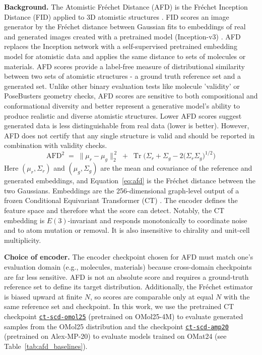 \documentclass{article} %
\begin{document}
\textbf{Background.} The Atomistic Fr\'echet Distance (AFD) is the Fr\'echet Inception Distance (FID) applied to 3D atomistic structures \cite{perez2026atomisticgenevals}. FID scores an image generator by the Fr\'echet distance between Gaussian fits to embeddings of real and generated images created with a pretrained model (Inception-v3) \cite{FID-paper}. AFD replaces the Inception network with a self-supervised pretrained embedding model for atomistic data and applies the same distance to sets of molecules or materials. AFD scores provide a label-free measure of distributional similarity between two sets of atomistic structures - a ground truth reference set and a generated set. Unlike other binary evaluation tests like molecule 'validity' or PoseBusters geometry checks, AFD scores are sensitive to both compositional and conformational diversity and better represent a generative model's ability to produce realistic and diverse atomistic structures. Lower AFD scores suggest generated data is less distinguishable from real data (lower is better). However, AFD does not certify that any single structure is valid and should be reported in combination with validity checks.
\begin{equation}
\mathrm{AFD}^2 \;=\; \lVert \mu_r - \mu_g \rVert_2^{\,2}
\;+\; \operatorname{Tr}\!\Big( \Sigma_r + \Sigma_g - 2\big(\Sigma_r \Sigma_g\big)^{1/2} \Big)
\label{eq:afd}
\end{equation}
Here $(\mu_r,\Sigma_r)$ and $(\mu_g,\Sigma_g)$ are the mean and covariance of the reference and generated embeddings, and Equation~\ref{eq:afd} is the Fr\'echet distance between the two Gaussians. Embeddings are the 256-dimensional graph-level output of a frozen Conditional Equivariant Transformer (CT) \cite{perez2026scd}. The encoder defines the feature space and therefore what the score can detect. Notably, the CT embedding is $E(3)$-invariant and responds monotonically to coordinate noise and to atom mutation or removal. It is also insensitive to chirality and unit-cell multiplicity.

\textbf{Choice of encoder.} The encoder checkpoint chosen for AFD must match one's evaluation domain (e.g., molecules, materials) because cross-domain checkpoints are far less sensitive. AFD is not an absolute score and requires a ground-truth reference set to define its target distribution. Additionally, the Fr\'echet estimator is biased upward at finite $N$, so scores are comparable only at equal $N$ with the same reference set and checkpoint. In this work, we use the pretrained CT checkpoint \href{https://huggingface.co/Ty-Perez/ct-scd-omol25}{\texttt{ct-scd-omol25}}  (pretrained on OMol25-4M) to evaluate generated samples from the OMol25 distribution and the checkpoint \href{https://huggingface.co/Ty-Perez/ct-scd-amp20}{\texttt{ct-scd-amp20} } (pretrained on Alex-MP-20) to evaluate models trained on OMat24 (see Table~\ref{tab:afd_baselines}).
\end{document}
